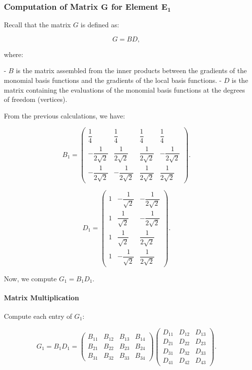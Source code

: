 \documentclass[class=article, crop=false]{standalone}
\begin{document}
\subsubsection{Computation of Matrix $\boldsymbol{G}$ for Element $\boldsymbol{E_1}$}

Recall that the matrix $G$ is defined as:

\[
G = B D,
\]

where:

- $B$ is the matrix assembled from the inner products between the gradients of the monomial basis functions and the gradients of the local basis functions.
- $D$ is the matrix containing the evaluations of the monomial basis functions at the degrees of freedom (vertices).

From the previous calculations, we have:

\[
B_1 = \begin{pmatrix}
\dfrac{1}{4} & \dfrac{1}{4} & \dfrac{1}{4} & \dfrac{1}{4} \\
- \dfrac{1}{2\sqrt{2}} & \dfrac{1}{2\sqrt{2}} & \dfrac{1}{2\sqrt{2}} & - \dfrac{1}{2\sqrt{2}} \\
- \dfrac{1}{2\sqrt{2}} & - \dfrac{1}{2\sqrt{2}} & \dfrac{1}{2\sqrt{2}} & \dfrac{1}{2\sqrt{2}}
\end{pmatrix}.
\]

\[
D_1 = \begin{pmatrix}
1 & -\dfrac{1}{\sqrt{2}} & -\dfrac{1}{2\sqrt{2}} \\
1 & \dfrac{1}{\sqrt{2}} & -\dfrac{1}{2\sqrt{2}} \\
1 & \dfrac{1}{\sqrt{2}} & \dfrac{1}{2\sqrt{2}} \\
1 & -\dfrac{1}{\sqrt{2}} & \dfrac{1}{2\sqrt{2}}
\end{pmatrix}.
\]

Now, we compute $G_1 = B_1 D_1$.

\paragraph{Matrix Multiplication}

Compute each entry of $G_1$:

\[
G_1 = B_1 D_1 = \begin{pmatrix}
B_{11} & B_{12} & B_{13} & B_{14} \\
B_{21} & B_{22} & B_{23} & B_{24} \\
B_{31} & B_{32} & B_{33} & B_{34}
\end{pmatrix}
\begin{pmatrix}
D_{11} & D_{12} & D_{13} \\
D_{21} & D_{22} & D_{23} \\
D_{31} & D_{32} & D_{33} \\
D_{41} & D_{42} & D_{43}
\end{pmatrix}.
\]
\end{document}
